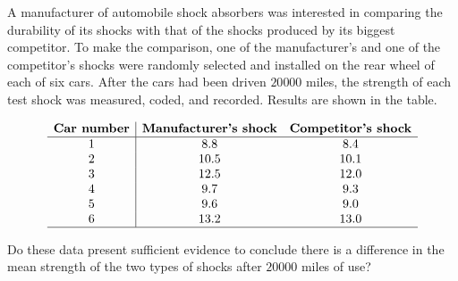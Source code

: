 
\begin{exercise}

A manufacturer of automobile shock absorbers was interested in comparing the durability of its shocks with that of the shocks produced by its biggest competitor.
To make the comparison, one of the manufacturer's and one of the competitor's shocks were randomly selected and installed on the rear wheel of each of six cars.
After the cars had been driven $20 000$ miles, the strength of each test shock was measured, coded, and recorded.
Results are shown in the table.

\begin{align*}
    \begin{array}{c|cc}
        \textbf{Car number}
        &
        \textbf{Manufacturer's shock}
        &
        \textbf{Competitor's shock} \\
        \hline
        1 & 8.8  & 8.4  \\
        2 & 10.5 & 10.1 \\
        3 & 12.5 & 12.0 \\
        4 & 9.7  & 9.3  \\
        5 & 9.6  & 9.0  \\
        6 & 13.2 & 13.0 \\
        \hline
    \end{array}
\end{align*}

Do these data present sufficient evidence to conclude there is a difference in the mean strength of the two types of shocks after $20 000$ miles of use?

\end{exercise}



